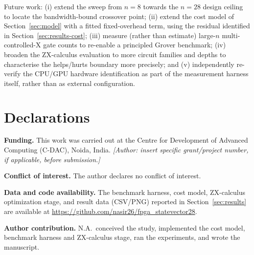 \documentclass[pdflatex,sn-mathphys,Numbered]{sn-jnl}
\begin{document}
Future work: (i) extend the sweep from $n=8$ towards the $n=28$ design ceiling to locate the bandwidth-bound crossover point; (ii) extend the cost model of Section~\ref{sec:model} with a fitted fixed-overhead term, using the residual identified in Section~\ref{sec:results-cost}; (iii) measure (rather than estimate) large-$n$ multi-controlled-X gate counts to re-enable a principled Grover benchmark; (iv) broaden the ZX-calculus evaluation to more circuit families and depths to characterise the helps/hurts boundary more precisely; and (v) independently re-verify the CPU/GPU hardware identification as part of the measurement harness itself, rather than as external configuration.

\backmatter

\section*{Declarations}

\textbf{Funding.} This work was carried out at the Centre for Development of Advanced Computing (C-DAC), Noida, India. \emph{[Author: insert specific grant/project number, if applicable, before submission.]}

\textbf{Conflict of interest.} The author declares no conflict of interest.

\textbf{Data and code availability.} The benchmark harness, cost model, ZX-calculus optimization stage, and result data (CSV/PNG) reported in Section~\ref{sec:results} are available at \url{https://github.com/nasir26/fpga_statevector28}.

\textbf{Author contribution.} N.A.\ conceived the study, implemented the cost model, benchmark harness and ZX-calculus stage, ran the experiments, and wrote the manuscript.
\end{document}
